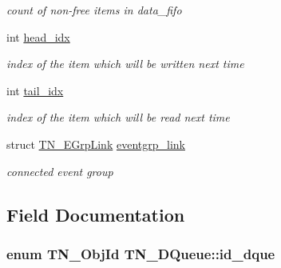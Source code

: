 \begin{DoxyCompactItemize}
\begin{DoxyCompactList}\small\item\em count of non-\/free items in {\ttfamily data\+\_\+fifo} \end{DoxyCompactList}\item 
\hypertarget{structTN__DQueue_a3451096f72cc02a2bed5573c2457323e}{int \hyperlink{structTN__DQueue_a3451096f72cc02a2bed5573c2457323e}{head\+\_\+idx}}\label{structTN__DQueue_a3451096f72cc02a2bed5573c2457323e}

\begin{DoxyCompactList}\small\item\em index of the item which will be written next time \end{DoxyCompactList}\item 
\hypertarget{structTN__DQueue_ab5451b7c143d4208c36d4227b79732a0}{int \hyperlink{structTN__DQueue_ab5451b7c143d4208c36d4227b79732a0}{tail\+\_\+idx}}\label{structTN__DQueue_ab5451b7c143d4208c36d4227b79732a0}

\begin{DoxyCompactList}\small\item\em index of the item which will be read next time \end{DoxyCompactList}\item 
\hypertarget{structTN__DQueue_a4c7d686c2f9f6a6bc2f875e1c4849ae1}{struct \hyperlink{structTN__EGrpLink}{T\+N\+\_\+\+E\+Grp\+Link} \hyperlink{structTN__DQueue_a4c7d686c2f9f6a6bc2f875e1c4849ae1}{eventgrp\+\_\+link}}\label{structTN__DQueue_a4c7d686c2f9f6a6bc2f875e1c4849ae1}

\begin{DoxyCompactList}\small\item\em connected event group \end{DoxyCompactList}\end{DoxyCompactItemize}


\subsection{Field Documentation}
\hypertarget{structTN__DQueue_afce2b73b8afc3b1537e34ff3a4a7114c}{
\subsubsection[{id\+\_\+dque}]{\setlength{\rightskip}{0pt plus 5cm}enum {\bf T\+N\+\_\+\+Obj\+Id} T\+N\+\_\+\+D\+Queue\+::id\+\_\+dque}}\label{structTN__DQueue_afce2b73b8afc3b1537e34ff3a4a7114c}


